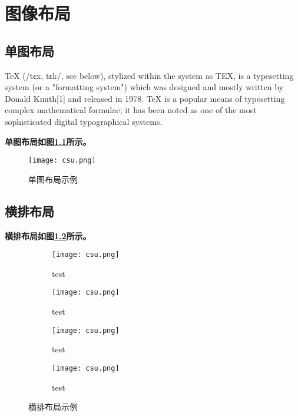 \chapter{图像布局}
\label{sec.figure}
\section{单图布局}

TeX (/tɛx, tɛk/, see below), stylized within the system as TEX, is a typesetting system (or a "formatting system") which was designed and mostly written by Donald Knuth[1] and released in 1978. TeX is a popular means of typesetting complex mathematical formulae; it has been noted as one of the most sophisticated digital typographical systems.


\textbf{单图布局如图\ref{F.csu_single}所示。}

\begin{figure}[hbt]
\centering
\texttt{[image: csu.png]}
\caption{单图布局示例}
\label{F.csu_single}
\end{figure}

\section{横排布局}

\textbf{横排布局如图\ref{F.csu_row}所示。}

\begin{figure}[!htb]
    \centering
    \begin{subfigure}[t]{0.24\linewidth}
        \begin{minipage}[b]{1\linewidth}
        \texttt{[image: csu.png]}
        \caption{test}
        \end{minipage}
    \end{subfigure}
    \begin{subfigure}[t]{0.24\linewidth}
        \begin{minipage}[b]{1\linewidth}
        \texttt{[image: csu.png]}
        \caption{test}
        \end{minipage}
    \end{subfigure}
    \begin{subfigure}[t]{0.24\linewidth}
        \begin{minipage}[b]{1\linewidth}
        \texttt{[image: csu.png]}
        \caption{test}
        \end{minipage}
    \end{subfigure}
    \begin{subfigure}[t]{0.24\linewidth}
        \begin{minipage}[b]{1\linewidth}
        \texttt{[image: csu.png]}
        \caption{test}
        \end{minipage}
    \end{subfigure}
    \caption{横排布局示例}
    \label{F.csu_row}
\end{figure}

